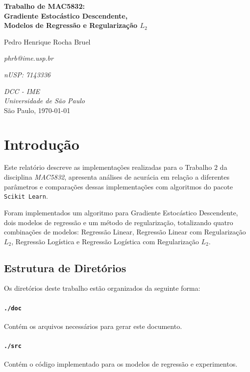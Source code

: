 \documentclass[a4paper, 12pt]{article}
\newcommand{\rom}[1]{\uppercase\expandafter{\romannumeral #1\relax}}
\begin{document}
\begin{titlepage}
    \centering
    \vspace*{4cm}
    \textbf{\Large{Trabalho \rom{2} de MAC5832: \\ Gradiente Estocástico Descendente, \\
    Modelos de Regressão e Regularização $L_2$}}\\

    \vskip 1cm

    Pedro Henrique Rocha Bruel

    \emph{phrb@ime.usp.br}

    \emph{nUSP: 7143336}

    \vfill
    \normalsize{\emph{DCC - IME\\
    Universidade de São Paulo}\\}
    \normalsize{São Paulo, \today}
\end{titlepage}

\section{Introdução} \label{sec:intro}

Este relatório descreve as implementações realizadas para o Trabalho $2$ da
disciplina \textit{MAC5832}, apresenta análises de acurácia em relação a
diferentes parâmetros e comparações dessas implementações com algoritmos do
pacote \texttt{Scikit Learn}.

Foram implementados um algoritmo para Gradiente Estocástico Descendente, dois
modelos de regressão e um método de regularização, totalizando quatro
combinações de modelos: Regressão Linear, Regressão Linear com Regularização
$L_2$, Regressão Logística e Regressão Logística com Regularização $L_2$.

\subsection{Estrutura de Diretórios}

Os diretórios deste trabalho estão organizados da
seguinte forma:

\paragraph{\texttt{./doc}} Contém os arquivos necessários
para gerar este documento.

\paragraph{\texttt{./src}} Contém o código implementado
para os modelos de regressão e experimentos.
\end{document}
